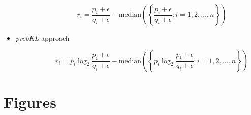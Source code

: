 \documentclass{bmcart}
\begin{document}
\begin{backmatter}
\begin{itemize}
\begin{equation}\label{log_ratio_r}
\qquad \qquad r_i =  \frac{p_i + \epsilon}{q_i + \epsilon} - \textrm{median} \left ( \left \{  \frac{p_i + \epsilon}{q_i + \epsilon} : i = 1, 2, \ldots, n \right \} \right )
\end{equation}

\item \textit{probKL} approach \cite{Thomsen2012}

\begin{equation}\label{probKL_r}
\qquad \qquad r_i =  p_i \log_2 \frac{p_i + \epsilon}{q_i + \epsilon} - \textrm{median} \left ( \left \{ p_i \log_2 \frac{p_i + \epsilon}{q_i + \epsilon} : i = 1, 2, \ldots, n \right \} \right )
\end{equation}
\end{itemize}



\end{backmatter}

\clearpage
\section*{Figures}
\clearpage

\appendix
\setcounter{page}{1}
\setcounter{figure}{0}
\setcounter{table}{0}
\renewcommand\thefigure{\arabic{figure}}
\renewcommand\thetable{\arabic{table}}
\end{document}
